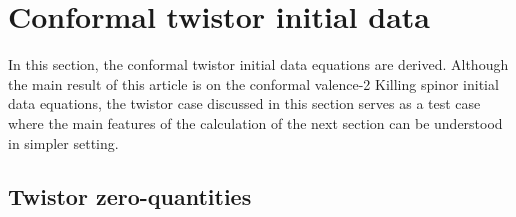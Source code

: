 \documentclass[10pt,a4paper]{article}
\theoremstyle{plain}
\begin{document}


  \section{Conformal twistor initial data}
  \label{conformalTwistorKID}
  In this section, the conformal twistor initial data equations are
  derived.  Although the main result of this article is on the
  conformal valence-2 Killing spinor initial data equations, the twistor
  case discussed in this section serves as a test case where the main
  features of the calculation of the next section can be understood in simpler setting.
\subsection{Twistor zero-quantities}
\label{Sec:TwistorZeroQuantities}
\end{document}
